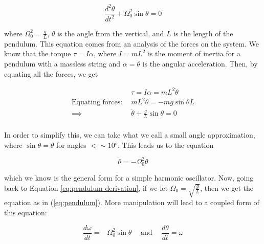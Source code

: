\documentclass[12pt]{article}
\begin{document}
    \begin{equation}
        \frac{d^2\theta}{dt^2}+\Omega_0^2\sin\theta = 0 
        \label{eq:pendulum}
    \end{equation}

    \noindent
    where $\Omega_0^2 = \frac{g}{L}$, $\theta$ is the angle from the vertical, and $L$ is the 
    length of the pendulum. This equation comes from an analysis of the forces on the system. 
    We know that the torque $\tau = I\alpha$, where $I = mL^2$ is the moment of inertia for a pendulum 
    with a massless string and $\alpha = \ddot{\theta}$ is the angular acceleration. Then, by 
    equating all the forces, we get

    \begin{equation*}
        \begin{split}
            &\tau = I\alpha = mL^2\ddot{\theta} \\
            \textrm{Equating forces:}\hspace{5pt} &mL^2\ddot{\theta} = -mg\sin\theta L \\
            \implies &\ddot{\theta} + \frac{g}{L}\sin\theta = 0 \\
        \end{split}
        \label{eq:pendulum derivation}
    \end{equation*}

    \noindent
    In order to simplify this, we can take what we call a small angle approximation, where 
    $\sin\theta = \theta$ for angles $<\sim\ang{10}$. This leads us to the equation 

    \begin{equation}
        \ddot{\theta} = -\Omega_0^2 \theta
        \label{eq:SHM}
    \end{equation}

    \noindent
    which we know is the general form for a simple harmonic oscillator.
    \newline
    \newline
    Now, going back to Equation \ref{eq:pendulum derivation}, if we let 
    $\Omega_0 = \sqrt{\frac{g}{L}}$, then we get the equation as in (\ref{eq:pendulum}). More 
    manipulation will lead to a coupled form of this equation:

    \begin{equation}
        \frac{d\omega}{dt}=-\Omega_0^2 \sin\theta 
        \hspace{15pt}
        \textrm{and}
        \hspace{15pt}
        \frac{d\theta}{dt}=\omega
        \label{eq:coupled pendulum}
    \end{equation}
\end{document}
